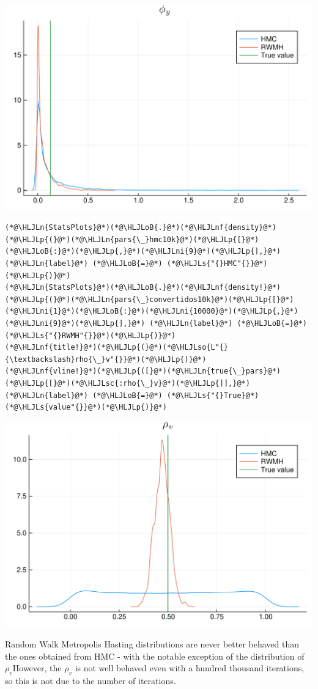 \documentclass[12pt,a4paper]{article}
\newcommand{\HLJLn}[1]{#1}
\newcommand{\HLJLnf}[1]{\textcolor[RGB]{66,102,213}{#1}}
\newcommand{\HLJLs}[1]{\textcolor[RGB]{201,61,57}{#1}}
\newcommand{\HLJLsc}[1]{\textcolor[RGB]{201,61,57}{#1}}
\newcommand{\HLJLso}[1]{\textcolor[RGB]{201,61,57}{#1}}
\newcommand{\HLJLni}[1]{\textcolor[RGB]{59,151,46}{#1}}
\newcommand{\HLJLoB}[1]{\textcolor[RGB]{102,102,102}{\textbf{#1}}}
\newcommand{\HLJLp}[1]{#1}
\begin{document}
\includegraphics[width=\linewidth]{figures/dsge_and_julia_60_1.pdf}

\begin{lstlisting}
(*@\HLJLn{StatsPlots}@*)(*@\HLJLoB{.}@*)(*@\HLJLnf{density}@*)(*@\HLJLp{(}@*)(*@\HLJLn{pars{\_}hmc10k}@*)(*@\HLJLp{[}@*)(*@\HLJLoB{:}@*)(*@\HLJLp{,}@*)(*@\HLJLni{9}@*)(*@\HLJLp{],}@*) (*@\HLJLn{label}@*) (*@\HLJLoB{=}@*) (*@\HLJLs{"{}HMC"{}}@*)(*@\HLJLp{)}@*)
(*@\HLJLn{StatsPlots}@*)(*@\HLJLoB{.}@*)(*@\HLJLnf{density!}@*)(*@\HLJLp{(}@*)(*@\HLJLn{pars{\_}convertidos10k}@*)(*@\HLJLp{[}@*)(*@\HLJLni{1}@*)(*@\HLJLoB{:}@*)(*@\HLJLni{10000}@*)(*@\HLJLp{,}@*)(*@\HLJLni{9}@*)(*@\HLJLp{],}@*) (*@\HLJLn{label}@*) (*@\HLJLoB{=}@*) (*@\HLJLs{"{}RWMH"{}}@*)(*@\HLJLp{)}@*)
(*@\HLJLnf{title!}@*)(*@\HLJLp{(}@*)(*@\HLJLso{L"{}{\textbackslash}rho{\_}v"{}}@*)(*@\HLJLp{)}@*)
(*@\HLJLnf{vline!}@*)(*@\HLJLp{([}@*)(*@\HLJLn{true{\_}pars}@*)(*@\HLJLp{[}@*)(*@\HLJLsc{:rho{\_}v}@*)(*@\HLJLp{]],}@*) (*@\HLJLn{label}@*) (*@\HLJLoB{=}@*) (*@\HLJLs{"{}True}@*) (*@\HLJLs{value"{}}@*)(*@\HLJLp{)}@*)
\end{lstlisting}

\includegraphics[width=\linewidth]{figures/dsge_and_julia_61_1.pdf}

Random Walk Metropolis Hasting distributions are never better behaved than the ones obtained from HMC - with the notable exception of the distribution of $\rho_v$However, the $\rho_v$ is not well behaved even with a hundred thousand iterations, so this is not due to the number of iterations.  
\end{document}
